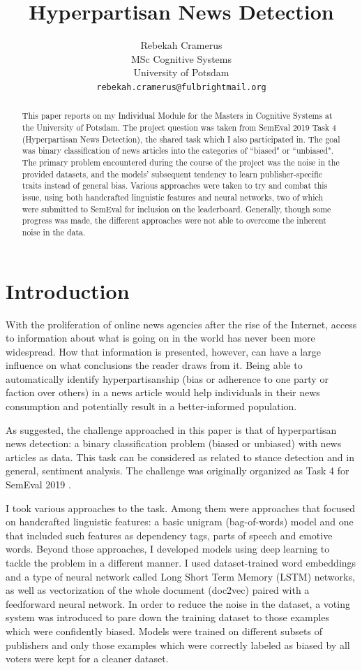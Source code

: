 \documentclass[11pt, a4paper]{article}
\title{Hyperpartisan News Detection}
\author{Rebekah Cramerus \\
  MSc Cognitive Systems \\
  University of Potsdam \\
  {\tt {\small rebekah.cramerus@fulbrightmail.org}} \\}
\date{}
\begin{document}
\maketitle
\begin{abstract}
This paper reports on my Individual Module for the Masters in Cognitive Systems at the University of Potsdam. The project question was taken from SemEval 2019 Task 4 (Hyperpartisan News Detection), the shared task which I also participated in. The goal was binary classification of news articles into the categories of ``biased" or ``unbiased". The primary problem encountered during the course of the project was the noise in the provided datasets, and the models' subsequent tendency to learn publisher-specific traits instead of general bias. Various approaches were taken to try and combat this issue, using both handcrafted linguistic features and neural networks, two of which were submitted to SemEval for inclusion on the leaderboard. Generally, though some progress was made, the different approaches were not able to overcome the inherent noise in the data.
\end{abstract}

\section{Introduction}

With the proliferation of online news agencies after the rise of the Internet, access to information about what is going on in the world has never been more widespread. How that information is presented, however, can have a large influence on what conclusions the reader draws from it. Being able to automatically identify hyperpartisanship (bias or adherence to one party or faction over others) in a news article would help individuals in their news consumption and potentially result in a better-informed population. 

As suggested, the challenge approached in this paper is that of hyperpartisan news detection: a binary classification problem (biased or unbiased) with news articles as data. This task can be considered as related to stance detection and in general, sentiment analysis. The challenge was originally organized as Task 4 for SemEval 2019 \cite{potthast:2018} \cite{kiesel:2019}. 

I took various approaches to the task. Among them were approaches that focused on handcrafted linguistic features: a basic unigram (bag-of-words) model and one that included such features as dependency tags, parts of speech and emotive words. Beyond those approaches, I developed models using deep learning to tackle the problem in a different manner. I used dataset-trained word embeddings and a type of neural network called Long Short Term Memory (LSTM) networks, as well as vectorization of the whole document (doc2vec) paired with a feedforward neural network. In order to reduce the noise in the dataset, a voting system was introduced to pare down the training dataset to those examples which were confidently biased. Models were trained on different subsets of publishers and only those examples which were correctly labeled as biased by all voters were kept for a cleaner dataset.
\end{document}
